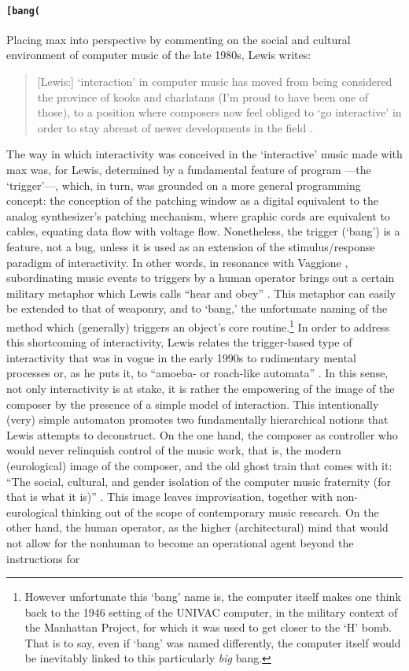 \paragraph{\texttt{[bang(}}
Placing \gls{max} into perspective by commenting on the social and cultural environment of computer music of the late 1980s, Lewis writes:

\begin{quote}
	[Lewis:] `interaction' in computer music has moved from being considered the province of kooks and charlatans (I'm proud to have been one of those), to a position where composers now feel obliged to `go interactive' in order to stay abreast of newer developments in the field \parencite[11]{Lew93:Put}.
\end{quote}

The way in which interactivity was conceived in the `interactive' music made with \gls{max} was, for Lewis, determined by a fundamental feature of program ---the `trigger'---, which, in turn, was grounded on a more general programming concept: the conception of the patching window as a digital equivalent to the analog synthesizer's patching mechanism, where graphic cords are equivalent to cables, equating data flow with voltage flow. Nonetheless, the trigger (`bang') is a feature, not a bug, unless it is used as an extension of the stimulus/response paradigm of interactivity. In other words, in resonance with Vaggione , subordinating music events to triggers by a human operator brings out a certain military metaphor which Lewis calls ``hear and obey'' \parencite[11]{Lew93:Put}. This metaphor can easily be extended to that of weaponry, and to `bang,' the unfortunate naming of the method which (generally) triggers an object's core routine.\footnote{However unfortunate this `bang' name is, the computer itself makes one think back to the 1946 setting of the UNIVAC computer, in the military context of the Manhattan Project, for which it was used to get closer to the `H' bomb. That is to say, even if `bang' was named differently, the computer itself would be inevitably linked to this particularly \textit{big} bang.} In order to address this shortcoming of interactivity, Lewis relates the trigger-based type of interactivity that was in vogue in the early 1990s to rudimentary mental processes or, as he puts it, to ``amoeba- or roach-like automata'' \parencite[11]{Lew93:Put}. In this sense, not only interactivity is at stake, it is rather the empowering of the image of the composer by the presence of a simple model of interaction. This intentionally (very) simple automaton promotes two fundamentally hierarchical notions that Lewis attempts to deconstruct. On the one hand, the composer as controller who would never relinquish control of the music work, that is, the modern (eurological) image of the composer, and the old ghost train that comes with it: ``The social, cultural, and gender isolation of the computer music fraternity (for that is what it is)'' \parencite[11]{Lew93:Put}. This image leaves improvisation, together with non-eurological thinking out of the scope of contemporary music research. On the other hand, the human operator, as the higher (architectural) mind that would not allow for the nonhuman to become an operational agent beyond the instructions for 